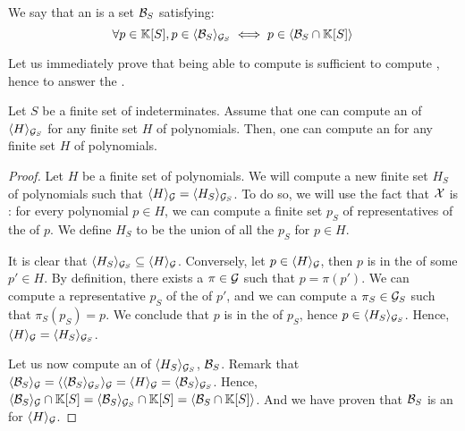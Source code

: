 We say that
an  is a set $\Basis_S$
satisfying:
\begin{equation*}
    \label{eq:supp-grob}
    \forall p \in \poly{\K}{S},
    p \in \gen{\Basis_S}{\group_S}
    \iff
    p \in \gen{\Basis_S \cap \poly{\K}{S}}{}
\end{equation*}

Let us immediately prove that being able to compute  is sufficient to compute , hence to
answer the .

\begin{lemma}
  \label{lem:local-to-supported}
  Let $S$ be a finite set of indeterminates.
  Assume that one can compute an 
  of $\langle H\rangle_{\mathcal{G}_S}$ for any finite set $H$ of polynomials.
  Then, 
  one can compute an 
  for any finite set $H$ 
  of polynomials.
\end{lemma}
\begin{proof}
  Let $H$ be a finite set of polynomials.
  We will compute a new finite set $H_S$ of polynomials
  such that $\langle H\rangle_{\mathcal{G}} = \langle H_S\rangle_{\mathcal{G}_S}$.
  To do so, we will use the fact that $\mathcal{X}$ is :
  for every polynomial $p \in H$, we can compute a finite set
  $p_S$ of representatives of the  of $p$.
  We define $H_S$ to be the union of all the $p_S$ for $p \in H$.

  It is clear that $\langle H_S\rangle_{\mathcal{G}_S} \subseteq \langle H\rangle_{\mathcal{G}}$.
  Conversely, let $p \in \langle H\rangle_{\mathcal{G}}$, then $p$ is in the 
  of some $p' \in H$. By definition, there exists a $\pi \in \mathcal{G}$ such that
  $p = \pi(p')$. We can compute a representative $p_S$ of the
   of $p'$, and we can compute a $\pi_S \in \mathcal{G}_S$
  such that $\pi_S(p_S) = p$. We conclude that $p$ is in the 
  of $p_S$, hence $p \in \langle H_S\rangle_{\mathcal{G}_S}$.
  Hence, $\langle H\rangle_{\mathcal{G}} = \langle H_S\rangle_{\mathcal{G}_S}$.

  Let us now compute an  of $\langle H_S\rangle_{\mathcal{G}_S}$,
  $\Basis_S$.  
  Remark that
  $\gen{\Basis_S}{\group} = \gen{\gen{\Basis_S}{\group_S}}{\group}
                           = \gen{H}{\group} 
                           = \gen{\Basis_S}{\group_S}$.
  Hence,
  $
    \gen{\Basis_S}{\group} \cap \poly{\K}{S} 
        = \gen{\Basis_S}{\group_S} \cap \poly{\K}{S}  
        = \gen{\Basis_S \cap \poly{\K}{S}}{} 
        $.
  And we have proven that $\Basis_S$ is an 
  for $\langle H\rangle_{\mathcal{G}}$.
\end{proof}


